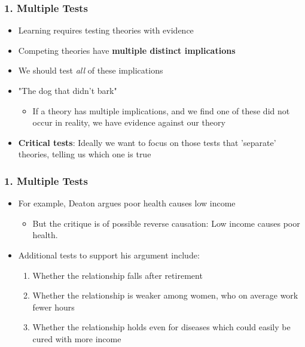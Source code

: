\documentclass[xcolor=x11names,compress]{beamer}\usepackage[]{graphicx}\usepackage[]{xcolor}
\renewcommand{\(}{\begin{columns}}
\renewcommand{\)}{\end{columns}}
\newcommand{\<}[1]{\begin{column}{#1}}
\renewcommand{\>}{\end{column}}
\begin{document}
\begin{frame}
\frametitle{1. Multiple Tests}
\begin{itemize}
\item Learning requires testing theories with evidence
\pause
\item Competing theories have \textbf{multiple distinct implications}
\pause
\item We should test \textit{all} of these implications
\item "The dog that didn't bark"
\pause
\begin{itemize}
\item If a theory has multiple implications, and we find one of these did not occur in reality, we have evidence against our theory
\pause
\end{itemize}
\item \textbf{Critical tests}: Ideally we want to focus on those tests that 'separate' theories, telling us which one is true
\end{itemize}
\end{frame}

\begin{frame}
\frametitle{1. Multiple Tests}
\begin{itemize}
\item For example, Deaton argues poor health causes low income
\pause
\begin{itemize}
\item But the critique is of possible reverse causation: Low income causes poor health.
\pause
\end{itemize}
\item Additional tests to support his argument include:
\pause
\begin{enumerate}
\item Whether the relationship falls after retirement
\pause
\item Whether the relationship is weaker among women, who on average work fewer hours
\pause
\item Whether the relationship holds even for diseases which could easily be cured with more income
\end{enumerate}
\end{itemize}
\end{frame}
\end{document}
